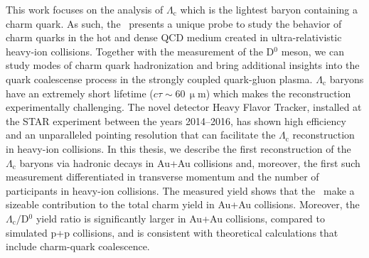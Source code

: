 
\newpage

\null \vfill {}
\bigskip

\noindent  This work focuses on the analysis of $\Lambda_\mathrm{c}$ which is the lightest baryon containing a charm quark. As such, the \Lambdac\ presents a unique probe to study
the behavior of charm quarks in the hot and dense QCD medium created in ultra-relativistic heavy-ion collisions. Together with the measurement of the D$^0$ meson,
we can study modes of charm quark hadronization and bring additional insights into the  quark coalescense process in the strongly coupled quark-gluon plasma.
$\Lambda_\mathrm{c}$ baryons have an extremely short lifetime ($c \tau \sim 60\,\upmu$m) which makes the reconstruction experimentally challenging. The novel detector Heavy Flavor Tracker, installed at the STAR experiment between the years 2014--2016, has
shown high efficiency and an unparalleled pointing resolution that can facilitate the $\Lambda_\mathrm{c}$ reconstruction  in heavy-ion collisions.
In this thesis, we describe the first reconstruction of the $\Lambda_\mathrm{c}$ baryons via hadronic decays in Au+Au collisions and, moreover, the first such measurement differentiated in transverse momentum and the number of participants in heavy-ion collisions. The measured yield shows that the \Lambdac\ make a sizeable contribution to the total charm yield in Au+Au collisions. Moreover, the $\Lambda_\mathrm{c}/$D$^0$ yield ratio is significantly larger in Au+Au collisions, compared to simulated p+p collisions, and is consistent with theoretical calculations that include charm-quark coalescence.
\\


 \newpage


\newpage

\null \vfill {}
\bigskip

